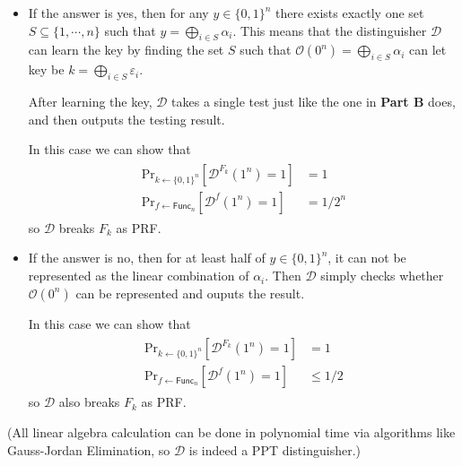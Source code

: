 \documentclass[8pt]{article}
\theoremstyle{compact}
\def\le{\leqslant}
\begin{document}
\begin{itemize}
	\item If the answer is yes, then for any $y \in \{0, 1\}^n$ there exists exactly one set $S \subseteq \{1, \cdots, n\}$ such that $y = \bigoplus\limits_{i \in S}\alpha_i$. This means that the distinguisher $\mathcal D$ can learn the key by finding the set $S$ such that $\mathcal O(0^n) = \bigoplus\limits_{i \in S}\alpha_i$ can let key be $k = \bigoplus\limits_{i\in S}\varepsilon_i$.
	
	After learning the key, $\mathcal D$ takes a single test just like the one in \textbf{Part B} does, and then outputs the testing result.

	In this case we can show that \begin{align*}
		\begin{split}
			\text{Pr}_{k \gets \{0, 1\}^n}\left[\mathcal D^{F_k}(1^n) = 1\right] &= 1 \\
			\text{Pr}_{f \gets \textsf{Func}_n}\left[\mathcal D^{f}(1^n) = 1\right] &= 1 / 2^n
		\end{split}
	\end{align*}
	so $\mathcal D$ breaks $F_k$ as PRF.
	\item If the answer is no, then for at least half of $y \in \{0, 1\}^n$, it can not be represented as the linear combination of $\alpha_i$. Then $\mathcal D$ simply checks whether $\mathcal O(0^n)$ can be represented and ouputs the result.
	
	In this case we can show that \begin{align*}
		\begin{split}
			\text{Pr}_{k \gets \{0, 1\}^n}\left[\mathcal D^{F_k}(1^n) = 1\right] &= 1 \\
			\text{Pr}_{f \gets \textsf{Func}_n}\left[\mathcal D^{f}(1^n) = 1\right] &\le 1/2
		\end{split}
	\end{align*}
	so $\mathcal D$ also breaks $F_k$ as PRF.
\end{itemize}

(All linear algebra calculation can be done in polynomial time via algorithms like Gauss-Jordan Elimination, so $\mathcal D$ is indeed a PPT distinguisher.)
\end{document}
